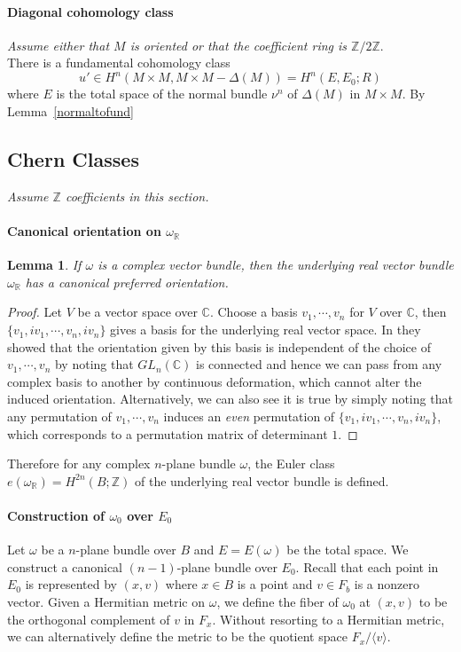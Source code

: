 \documentclass[12pt]{article}
\theoremstyle{plain}
\newtheorem{lemma}[equation]{Lemma}
\theoremstyle{definition}
\newcommand{\IC}{\mathbb{C}}
\newcommand{\IR}{\mathbb{R}}
\newcommand{\IZ}{\mathbb{Z}}
\newcommand{\<}{\langle}
\renewcommand{\>}{\rangle}
\newcommand{\w}{\omega}
\begin{document}
\paragraph{Diagonal cohomology class}
\textit{Assume either that $M$ is oriented or that the coefficient ring is $\IZ/2\IZ$}.\\
There is a fundamental cohomology class 
$$ u' \in H^n(M \times M, M \times M - \Delta(M)) = H^n(E, E_0; R)$$
where $E$ is the total space of the normal bundle $\nu^n$ of $\Delta(M)$ in $M \times M$. By Lemma~\ref{normaltofund} 

\subsection{Chern Classes}
\textit{Assume $\IZ$ coefficients in this section.}
\paragraph{Canonical orientation on $\w_\IR$}
\begin{lemma}
If $\w$ is a complex vector bundle, then the underlying real vector bundle $\w_\IR$ has a canonical preferred orientation. 
\end{lemma}
\begin{proof}
Let $V$ be a vector space over $\IC$. Choose a basis $v_1, \cdots, v_n$ for $V$ over $\IC$, then $\{v_1, iv_1, \cdots, v_n, i v_n \}$ gives a basis for the underlying real vector space. In \cite{Milnor} they showed that the orientation given by this basis is independent of the choice of $v_1, \cdots, v_n$ by noting that $GL_n(\IC)$ is connected and hence we can pass from any complex basis to another by continuous deformation, which cannot alter the induced orientation. Alternatively, we can also see it is true by simply noting that any permutation of $v_1, \cdots, v_n$ induces an \textit{even} permutation of $\{v_1, i v_1, \cdots, v_n, i v_n \}$, which corresponds to a permutation matrix of determinant $1$. 
\end{proof}
Therefore for any complex $n$-plane bundle $\w$, the Euler class $e(\w_\IR) = H^{2n}(B; \IZ)$ of the underlying real vector bundle is defined. 


\paragraph{Construction of $\w_0$ over $E_0$} Let $\w$ be a $n$-plane bundle over $B$ and $E = E(\w)$ be the total space. We construct a canonical $(n -1)$-plane bundle over $E_0$. Recall that each point in $E_0$ is represented by $(x, v)$ where $x \in B$ is a point and $v \in F_b$ is a nonzero vector. Given a Hermitian metric on $\w$, we define the fiber of $\w_0$ at $(x, v)$ to be the orthogonal complement of $v$ in $F_x$. Without resorting to a Hermitian metric, we can alternatively define the metric to be the quotient space $F_x/\< v \>$. 
\end{document}
